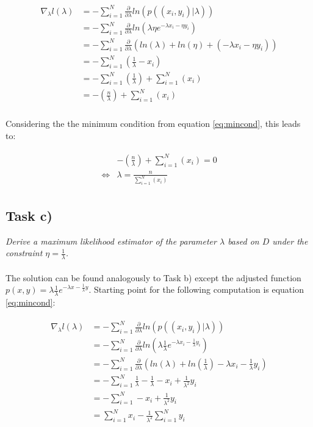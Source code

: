 \documentclass{article}
\begin{document}
\begin{align}
\begin{aligned}
\nabla_\lambda l(\lambda) & = - \sum_{i=1}^{N} \frac{\partial}{\partial \lambda} ln(p((x_i, y_i)|\lambda)) \\
					 & = - \sum_{i=1}^{N} \frac{\partial}{\partial \lambda} ln(\lambda\eta e ^ {- \lambda x_i - \eta y_i}) \\
					 & = - \sum_{i=1}^{N} \frac{\partial}{\partial \lambda} (ln(\lambda) + ln(\eta) + (- \lambda x_i - \eta y_i)) \\
					 & = - \sum_{i=1}^{N} (\frac{1}{\lambda} - x_i) \\
					 & = - \sum_{i=1}^{N} (\frac{1}{\lambda})  + \sum_{i=1}^{N}( x_i) \\
					 & = - (\frac{n}{\lambda})  + \sum_{i=1}^{N}( x_i) \\
\end{aligned}
\end{align}

Considering the the minimum condition from equation \ref{eq:mincond}, this leads to:

\begin{align}
\begin{aligned}
 			& - (\frac{n}{\lambda})  + \sum_{i=1}^{N}( x_i) 	= 0\\
 \Leftrightarrow  & \lambda =  \frac{n}{\sum_{i=1}^{N}( x_i)}
\end{aligned}
\end{align}

\subsection*{Task c)}

\textit{Derive a maximum likelihood estimator of the parameter $\lambda$ based on $D$ under the constraint $\eta = \frac{1}{\lambda}$.}\\
\\
The solution can be found analogously to Task b) except the adjusted function $p(x, y) = \lambda\frac{1}{\lambda} e ^ {- \lambda x - \frac{1}{\lambda} y}$. Starting point for the following computation is equation \ref{eq:mincond}:

\begin{align}
\begin{aligned}
\nabla_\lambda l(\lambda) & = - \sum_{i=1}^{N} \frac{\partial}{\partial \lambda} ln(p((x_i, y_i)|\lambda))\\
					& = - \sum_{i=1}^{N} \frac{\partial}{\partial \lambda} ln(\lambda\frac{1}{\lambda} e ^ {- \lambda x_i - \frac{1}{\lambda} y_i})\\
					& = - \sum_{i=1}^{N} \frac{\partial}{\partial \lambda} (ln(\lambda) + ln(\frac{1}{\lambda}) - \lambda x_i - \frac{1}{\lambda} y_i)\\
					& = - \sum_{i=1}^{N} \frac{1}{\lambda}  - \frac{1}{\lambda} - x_i + \frac{1}{\lambda^2} y_i\\
					& = - \sum_{i=1}^{N} - x_i + \frac{1}{\lambda^2} y_i\\
					& = \sum_{i=1}^{N} x_i - \frac{1}{\lambda^2} \sum_{i=1}^{N} y_i\\
\end{aligned}
\end{align}
\end{document}
